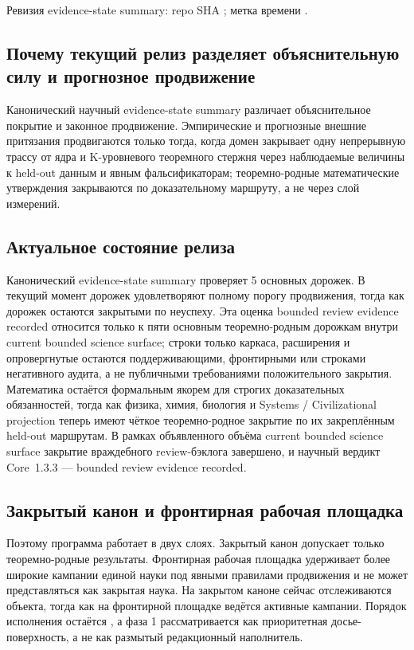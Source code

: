 Ревизия evidence-state summary: repo SHA ; метка времени .

\subsection{Почему текущий релиз разделяет объяснительную силу и прогнозное продвижение}
Канонический научный evidence-state summary различает объяснительное покрытие и законное продвижение. Эмпирические и прогнозные внешние притязания продвигаются только тогда, когда домен закрывает одну непрерывную трассу от ядра и K-уровневого теоремного стержня через наблюдаемые величины к held-out данным и явным фальсификаторам; теоремно-родные математические утверждения закрываются по доказательному маршруту, а не через слой измерений.

\subsection{Актуальное состояние релиза}
Канонический evidence-state summary проверяет 5 основных дорожек. В текущий момент  дорожек удовлетворяют полному порогу продвижения, тогда как  дорожек остаются закрытыми по неуспеху.
Эта оценка bounded review evidence recorded относится только к пяти основным теоремно-родным дорожкам внутри current bounded science surface; строки только каркаса, расширения и опровергнутые остаются поддерживающими, фронтирными или строками негативного аудита, а не публичными требованиями положительного закрытия.
Математика остаётся формальным якорем для строгих доказательных обязанностей, тогда как физика, химия, биология и Systems / Civilizational projection теперь имеют чёткое теоремно-родное закрытие по их закреплённым held-out маршрутам. В рамках объявленного объёма current bounded science surface закрытие враждебного review-бэклога завершено, и научный вердикт Core~1.3.3 — bounded review evidence recorded.

\subsection{Закрытый канон и фронтирная рабочая площадка}
Поэтому программа работает в двух слоях. Закрытый канон допускает только теоремно-родные результаты. Фронтирная рабочая площадка удерживает более широкие кампании единой науки под явными правилами продвижения и не может представляться как закрытая наука.
На закрытом каноне сейчас отслеживаются  объекта, тогда как на фронтирной площадке ведётся  активные кампании.
Порядок исполнения остаётся , а фаза 1 рассматривается как приоритетная досье-поверхность, а не как размытый редакционный наполнитель.

